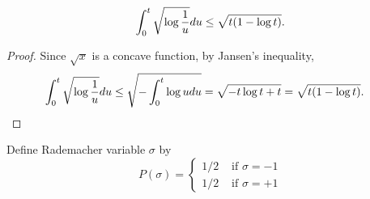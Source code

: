\begin{lemma}\label{logintegral}
\begin{align} 
\int_0^t\sqrt{\log {1\over u}} du\le  \sqrt{t(1-\log t)}.
\end{align}
\end{lemma}
\begin{proof}
Since $\sqrt{x}$ is a concave function,   by Jansen's inequality,
\begin{align} 
\int_0^t\sqrt{\log {1\over u}} du&\le \sqrt{-\int_0^t \log u du} = \sqrt{-t\log t + t}=\sqrt{t(1-\log t)}.
\end{align}
\end{proof}

Define Rademacher variable $\sigma$ by
\begin{equation}
P(\sigma)=\left\{\begin{array}{cc}
1 / 2 & \text { if } \sigma=-1 \\
1 / 2 & \text { if } \sigma=+1 
\end{array}\right.
\end{equation}

